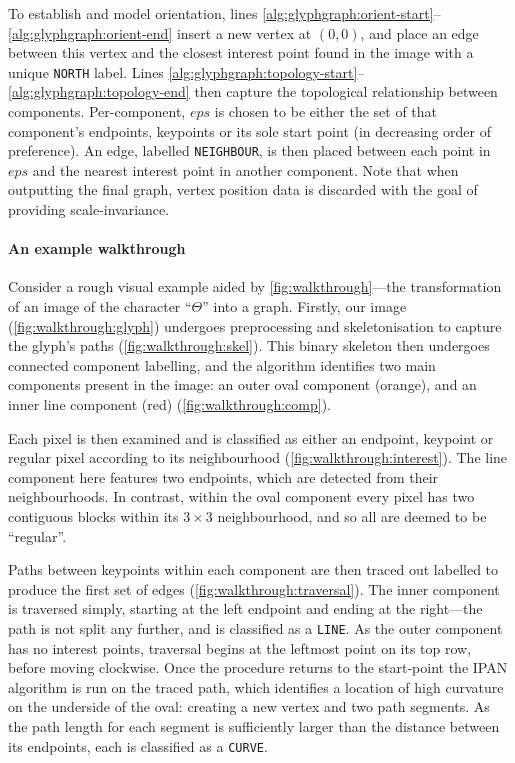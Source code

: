 \documentclass{mpaper}
\begin{document}
To establish and model orientation, lines \ref{alg:glyphgraph:orient-start}--\ref{alg:glyphgraph:orient-end} insert a new vertex at $(0,0)$, and place an edge between this vertex and the closest interest point found in the image with a unique \texttt{NORTH} label.
Lines \ref{alg:glyphgraph:topology-start}--\ref{alg:glyphgraph:topology-end} then capture the topological relationship between components.
Per-component, $eps$ is chosen to be either the set of that component's endpoints, keypoints or its sole start point (in decreasing order of preference).
An edge, labelled \texttt{NEIGHBOUR}, is then placed between each point in $eps$ and the nearest interest point in another component.
Note that when outputting the final graph, vertex position data is discarded with the goal of providing scale-invariance.


\paragraph{An example walkthrough}
Consider a rough visual example aided by \cref{fig:walkthrough}---the transformation of an image of the character ``$\Theta$'' into a graph.
Firstly, our image (\cref{fig:walkthrough:glyph}) undergoes preprocessing and skeletonisation to capture the glyph's paths (\cref{fig:walkthrough:skel}).
This binary skeleton then undergoes connected component labelling, and the algorithm  identifies two main components present in the image: an outer oval component (orange), and an inner line component (red) (\cref{fig:walkthrough:comp}).

Each pixel is then examined and is classified as either an endpoint, keypoint or regular pixel according to its neighbourhood (\cref{fig:walkthrough:interest}).
The line component here features two endpoints, which are detected from their neighbourhoods.
In contrast, within the oval component every pixel has two contiguous blocks within its $3\times3$ neighbourhood, and so all are deemed to be ``regular''.

Paths between keypoints within each component are then traced out labelled to produce the first set of edges (\cref{fig:walkthrough:traversal}).
The inner component is traversed simply, starting at the left endpoint and ending at the right---the path is not split any further, and is classified as a \texttt{LINE}.
As the outer component has no interest points, traversal begins at the leftmost point on its top row, before moving clockwise.
Once the procedure returns to the start-point the IPAN algorithm is run on the traced path, which identifies a location of high curvature on the underside of the oval: creating a new vertex and two path segments.
As the path length for each segment is sufficiently larger than the distance between its endpoints, each is classified as a \texttt{CURVE}.
\end{document}
